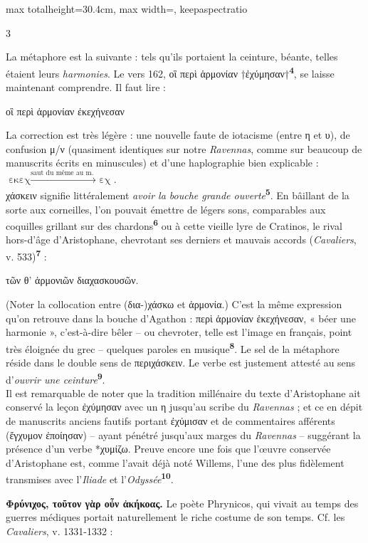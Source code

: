 \documentclass[11pt,twoside]{book}
\newcommand{\italique}[1]{\textit{#1}}
\newcommand{\citComm}[1]{\begin{quoting}[vskip=0.4pt,leftmargin=0.7em,rightmargin=0.2em]#1\end{quoting}}
\newcommand{\marqueur}[1]{\textsuperscript{\color{rubricRed}\textbf{#1}}}
\begin{document}
\begin{adjustbox}{max totalheight=30.4cm, max width=\textwidth, keepaspectratio}
\begin{minipage}{\textwidth}
{\begin{multicols}{3}
\par\vspace{1.5pt}
\noindent La métaphore est la suivante : tels qu'ils portaient la ceinture, béante, telles étaient leurs \italique{harmonies}. Le vers 162, οἳ περὶ ἁρμονίαν †ἐχύμησαν†\marqueur{4}, se laisse maintenant comprendre. Il faut lire :
\citComm{οἳ περὶ ἁρμονίαν ἐκεχήνεσαν}
\par\vspace{1.5pt}
\noindent La correction est très légère : une nouvelle faute de iotacisme (entre η et υ), de confusion μ/ν (quasiment identiques sur notre \italique{Ravennas}, comme sur beaucoup de manuscrits écrits en minuscules) et d'une haplographie bien explicable :  $\text{εκεχ} \xrightarrow{\text{saut du même au m. }} \text{ εχ}$.\\ χάσκειν signifie littéralement \italique{avoir la bouche grande ouverte}\marqueur{5}. En bâillant de la sorte aux corneilles, l'on pouvait émettre de légers sons, comparables aux coquilles grillant sur des chardons\marqueur{6} ou à cette vieille lyre de Cratinos, le rival hors-d'âge d'Aristophane, chevrotant ses derniers et mauvais accords (\italique{Cavaliers}, v. 533)\marqueur{7} :
\citComm{τῶν θ' ἁρμονιῶν διαχασκουσῶν.}
\par\vspace{1.5pt}
\noindent (Noter la collocation entre (δια-)χάσκω et ἁρμονία.)  C'est la même expression qu'on retrouve dans la bouche d'Agathon : περὶ ἁρμονίαν ἐκεχήνεσαν, « béer une harmonie », c'est-à-dire bêler -- ou chevroter, telle est l'image en français, point très éloignée du grec -- quelques paroles en musique\marqueur{8}. Le sel de la métaphore réside dans le double sens de περιχάσκειν. Le verbe est justement attesté au sens d'\italique{ouvrir une ceinture}\marqueur{9}.\\ Il est remarquable de noter que la tradition millénaire du texte d'Aristophane ait conservé la leçon ἐχύμησαν avec un η jusqu'au scribe du \italique{Ravennas} ; et ce en dépit de manuscrits anciens fautifs portant ἐχύμισαν et de commentaires afférents (ἔγχυμον ἐποίησαν) -- ayant pénétré jusqu'aux marges du \italique{Ravennas} -- suggérant la présence d'un verbe *χυμίζω. Preuve encore une fois que l'œuvre conservée d'Aristophane est, comme l'avait déjà noté Willems, l'une des plus fidèlement transmises avec l'\italique{Iliade} et l'\italique{Odyssée}\marqueur{10}.
\par\vspace{1.5pt}
 \textbf{Φρύνιχος, τοῦτον γὰρ οὖν ἀκήκοας.} Le poète Phrynicos, qui vivait au temps des guerres médiques portait naturellement le riche costume de son temps. Cf. les \italique{Cavaliers}, v. 1331-1332 :

\end{multicols}}
\end{minipage}
\end{adjustbox}
\end{document}
